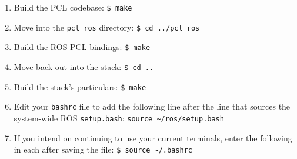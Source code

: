 \documentclass[12pt]{report}
\begin{document}
\begin{sloppypar}
\begin{enumerate}
\item{Build the PCL codebase: \texttt{\$\ make}}
\item{Move into the \texttt{pcl\_ros} directory: \texttt{\$\ cd ../pcl\_ros}}
\item{Build the ROS PCL bindings: \texttt{\$\ make}}
\item{Move back out into the stack: \texttt{\$\ cd ..}}
\item{Build the stack's particulars: \texttt{\$\ make}}
\item{Edit your \texttt{bashrc} file to add the following line after the line that sources the system-wide ROS \texttt{setup.bash}: \texttt{source \~{}/ros/setup.bash}}
\item{If you intend on continuing to use your current terminals, enter the following in each after saving the file: \texttt{\$\ source \~{}/.bashrc}}
\end{enumerate}
\end{sloppypar}
\end{document}
